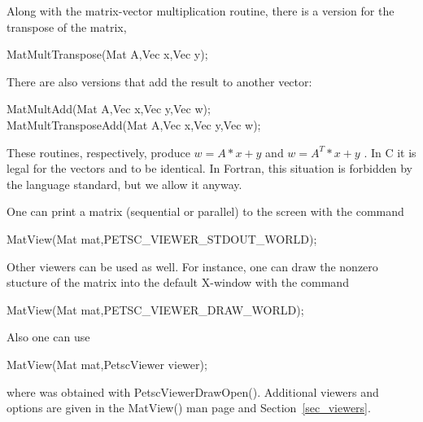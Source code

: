 Along with the matrix-vector multiplication routine, there is 
a version for the transpose of the matrix, 
\begin{tabbing}
  MatMultTranspose(Mat A,Vec x,Vec y);
\end{tabbing}
There are also versions that add the result
to another vector: 
\begin{tabbing}
  MatMultAdd(Mat A,Vec x,Vec y,Vec w);\\
  MatMultTransposeAdd(Mat A,Vec x,Vec y,Vec w);
\end{tabbing}
These routines, respectively, produce $ w = A*x + y $ and $ w = A^{T}*x + y$ . 
In C it is legal for the vectors  and  to be identical.
In Fortran, this situation is forbidden by the language standard, 
but we allow it anyway.

One can print a matrix (sequential or parallel) to the screen with the 
command 
\begin{tabbing}
  MatView(Mat mat,PETSC_VIEWER_STDOUT_WORLD);
\end{tabbing}
Other viewers can be used as well. For instance, one can draw the
nonzero stucture of the matrix into the default X-window with the 
command 
\begin{tabbing}
  MatView(Mat mat,PETSC_VIEWER_DRAW_WORLD);
\end{tabbing}
Also one can use 
\begin{tabbing}
  MatView(Mat mat,PetscViewer viewer);
\end{tabbing}
where  was obtained with PetscViewerDrawOpen().
Additional viewers and options are given in the MatView() man
page and Section~\ref{sec_viewers}.

